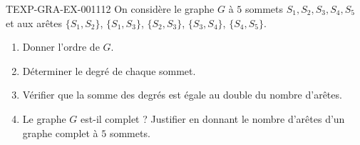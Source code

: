 \begin{exercice}{TEXP-GRA-EX-001}{1}{12}
On considère le graphe $G$ à $5$ sommets $S_1,S_2,S_3,S_4,S_5$ et aux arêtes $\{S_1,S_2\}$, $\{S_1,S_3\}$, $\{S_2,S_3\}$, $\{S_3,S_4\}$, $\{S_4,S_5\}$.
\begin{enumerate}
  \item Donner l'ordre de $G$.
  \item Déterminer le degré de chaque sommet.
  \item Vérifier que la somme des degrés est égale au double du nombre d'arêtes.
  \item Le graphe $G$ est-il complet ? Justifier en donnant le nombre d'arêtes d'un graphe complet à $5$ sommets.
\end{enumerate}
\end{exercice}
